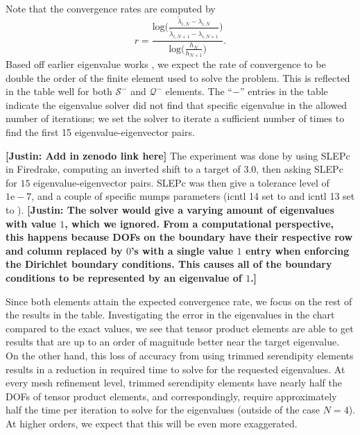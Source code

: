 \documentclass[format=acmsmall,screen,timestamp=false,a4paper]{acmart}
\newcommand\justin[1]{\textbf{\textcolor[rgb]{0,1,0.5}{[Justin: #1]}}}
\newcommand{\calQ}{\mathcal{Q}}
\newcommand{\calS}{\mathcal{S}}
\begin{document}
Note that the convergence rates are computed by
\[r = \frac{\text{log}\bigg(\frac{\tilde{\lambda}_{i,N} - \lambda_{i,N}}{\tilde{\lambda}_{i,N+1} - \lambda_{i,N+1}} \bigg)}{\text{log}\bigg( \frac{h_N}{h_{N+1}} \bigg)}. \]
\noindent  Based off earlier eigenvalue works \cite{boffi2010finite}, we expect the rate of convergence to be double the order of the finite element used to solve the problem.  This is reflected in the table well for both $\mathcal{S}^-$ and $\mathcal{Q}^-$ elements.  The ``$-$'' entries in the table indicate the eigenvalue solver did not find that specific eigenvalue in the allowed number of iterations; we set the solver to iterate a sufficient number of times to find the first 15 eigenvalue-eigenvector pairs.



\justin{Add in zenodo link here}
The experiment was done by using SLEPc in Firedrake, computing an inverted shift to a target of $3.0$, then asking SLEPc for $15$ eigenvalue-eigenvector pairs.  SLEPc was then give a tolerance level of $1\text{e}-7$, and a couple of specific mumps parameters ({\selectfont icntl 14} set to {} and {\selectfont icntl 13} set to {}). \justin{The solver would give a varying amount of eigenvalues with value $1$, which we ignored.  From a computational perspective, this happens because DOFs on the boundary have their respective row and column replaced by $0$'s with a single value $1$ entry when enforcing the Dirichlet boundary conditions.  This causes all of the boundary conditions to be represented by an eigenvalue of $1$.} 

Since both elements attain the expected convergence rate, we focus on the rest of the results in the table.  Investigating the error in the eigenvalues in the chart compared to the exact values, we see that tensor product elements are able to get results that are up to an order of magnitude better near the target eigenvalue.  On the other hand, this loss of accuracy from using trimmed serendipity elements results in a reduction in required time to solve for the requested eigenvalues.  At every mesh refinement level, trimmed serendipity elements have nearly half the DOFs of tensor product elements, and correspondingly, require approximately half the time per iteration to solve for the eigenvalues (outside of the case $N=4$).  At higher orders, we expect that this will be even more exaggerated.  
\end{document}
